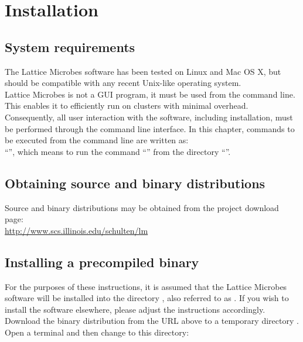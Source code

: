 \chapter{Installation}

\section{System requirements}

The Lattice Microbes software has been tested on Linux and Mac OS X, but should be compatible with any recent Unix-like operating system.\\

Lattice Microbes is not a GUI program, it must be used from the command line. This enables it to efficiently run on  clusters with minimal overhead. Consequently, all user interaction with the software, including installation, must be performed through the command line interface. In this chapter, commands to be executed from the command line are written as:\\
``'', which means to run the command ``'' from the directory ``''.

\section{Obtaining source and binary distributions}

Source and binary distributions may be obtained from the project download page:\\
\url{http://www.scs.illinois.edu/schulten/lm}

\section{Installing a precompiled binary}

For the purposes of these instructions, it is assumed that the Lattice Microbes software will be installed into the directory , also referred to as . If you wish to install the software elsewhere, please adjust the instructions accordingly.\\

Download the binary distribution from the URL above to a temporary directory .\\

Open a terminal and then change to this directory: \\

